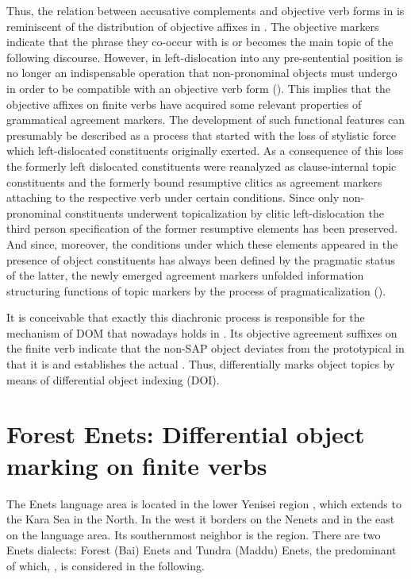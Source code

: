 \documentclass[output=paper]{LSP/langsci}
\begin{document}
Thus, the relation between accusative complements and objective verb forms in  is reminiscent of the distribution of objective affixes in . The  objective markers indicate that the  phrase they co-occur with is or becomes the main topic of the following discourse. However, in  left-dislocation into any pre-sentential position is no longer an indispensable operation that non-pronominal objects must undergo in order to be compatible with an objective verb form (\cf {}). This implies that the objective affixes on  finite verbs have acquired some relevant properties of grammatical agreement markers. The development of such functional features can presumably be described as a  process that started with the loss of stylistic force which left-dislocated constituents originally exerted. As a consequence of this loss the formerly left dislocated constituents were reanalyzed as clause-internal topic constituents and the formerly bound resumptive clitics as agreement markers attaching to the respective verb under certain conditions. Since only non-pronominal constituents underwent topicalization by clitic left-dislocation the third person specification of the former resumptive elements has been preserved. And since, moreover, the conditions under which these elements appeared in the presence of object constituents has always been defined by the pragmatic status of the latter, the newly emerged agreement markers unfolded information structuring functions of topic markers by the process of pragmaticalization (\cf \citealt{Diewald2011Pragmaticalization}). 

It is conceivable that exactly this diachronic process is responsible for the mechanism of DOM that nowadays holds in . Its objective agreement suffixes on the finite verb indicate that the non-SAP object deviates from the prototypical  in that it is  and establishes the actual . Thus,  differentially marks object topics by means of differential object indexing (DOI). 


\section{Forest Enets: Differential object marking on finite verbs}\label{12-wr-sec:5}

The Enets language area is located in the lower Yenisei region \citep[457]{Janhunen1998Samoyedic}, which extends to the Kara Sea in the North. In the west it borders on the Nenets and in the east on the  language area. Its southernmost  neighbor is the  region. There are two Enets dialects: Forest (Bai) Enets and Tundra (Maddu) Enets, the predominant of which, , is considered in the following. 
\end{document}
